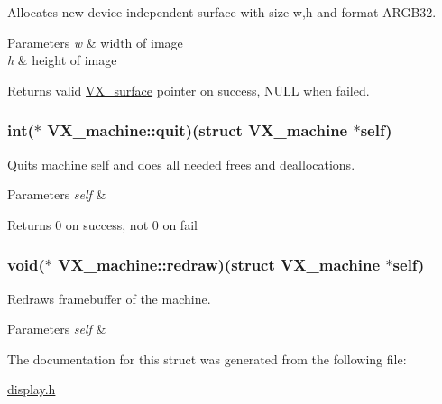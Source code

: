 Allocates new device-\/independent surface with size w,h and format A\-R\-G\-B32. 
\begin{DoxyParams}{Parameters}
{\em w} & width of image \\
\hline
{\em h} & height of image \\
\hline
\end{DoxyParams}
\begin{DoxyReturn}{Returns}
valid \hyperlink{structVX__surface}{V\-X\-\_\-surface} pointer on success, N\-U\-L\-L when failed. 
\end{DoxyReturn}
\hypertarget{structVX__machine_aa5cef4ff4d7c4bcceff65c2556538276}{
\subsubsection[{quit}]{\setlength{\rightskip}{0pt plus 5cm}int($\ast$ V\-X\-\_\-machine\-::quit)(struct {\bf V\-X\-\_\-machine} $\ast$self)}}\label{structVX__machine_aa5cef4ff4d7c4bcceff65c2556538276}
Quits machine self and does all needed frees and deallocations. 
\begin{DoxyParams}{Parameters}
{\em self} & \\
\hline
\end{DoxyParams}
\begin{DoxyReturn}{Returns}
0 on success, not 0 on fail 
\end{DoxyReturn}
\hypertarget{structVX__machine_a5f2254de23697f967ca4aad5eb4ca77f}{
\subsubsection[{redraw}]{\setlength{\rightskip}{0pt plus 5cm}void($\ast$ V\-X\-\_\-machine\-::redraw)(struct {\bf V\-X\-\_\-machine} $\ast$self)}}\label{structVX__machine_a5f2254de23697f967ca4aad5eb4ca77f}
Redraws framebuffer of the machine. 
\begin{DoxyParams}{Parameters}
{\em self} & \\
\hline
\end{DoxyParams}


The documentation for this struct was generated from the following file\-:\begin{DoxyCompactItemize}
\item 
\hyperlink{display_8h}{display.\-h}\end{DoxyCompactItemize}
